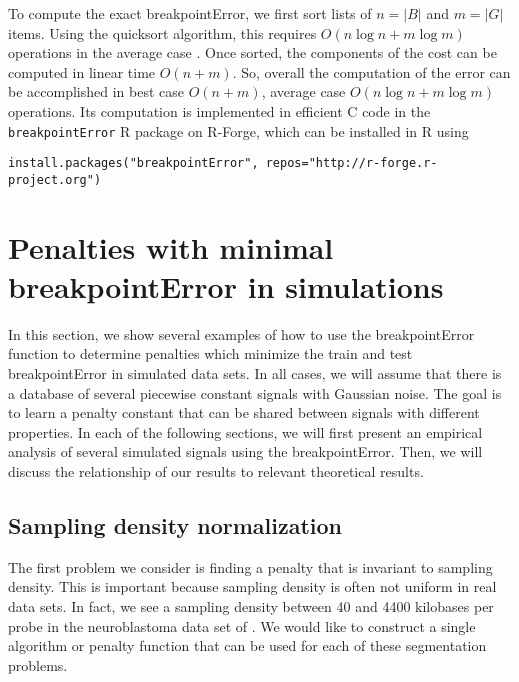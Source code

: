 \documentclass{article}
\begin{document}
To compute the exact breakpointError, we first sort lists of $n=|B|$
and $m=|G|$ items. Using the quicksort algorithm, this requires
$O(n\log n + m\log m)$ operations in the average case
\citep{clrs}. Once sorted, the components of the cost can be computed
in linear time $O(n + m)$. So, overall the computation of the error
can be accomplished in best case $O(n + m)$, average case $O(n\log n +
m\log m)$ operations. Its computation is implemented in efficient C
code in the \verb|breakpointError| R package on R-Forge, which can be
installed in R using

\begin{verbatim}
install.packages("breakpointError", repos="http://r-forge.r-project.org")
\end{verbatim}


\newpage

\section{Penalties with minimal breakpointError in simulations}
\label{sec:simulations}
In this section, we show several examples of how to use the
breakpointError function to determine penalties which minimize the
train and test breakpointError in simulated data sets. In all cases,
we will assume that there is a database of several piecewise constant
signals with Gaussian noise. The goal is to learn a penalty constant
that can be shared between signals with different properties. In each
of the following sections, we will first present an empirical analysis
of several simulated signals using the breakpointError. Then, we will
discuss the relationship of our results to relevant theoretical
results.

\subsection{Sampling density normalization}
\label{variable_density}
The first problem we consider is finding a penalty that is invariant
to sampling density. This is important because sampling density is
often not uniform in real data sets. In fact, we see a sampling
density between 40 and 4400 kilobases per probe in the neuroblastoma
data set of \citet{HOCKING-breakpoints}. We would like to construct a
single algorithm or penalty function that can be used for each of
these segmentation problems.
\end{document}

